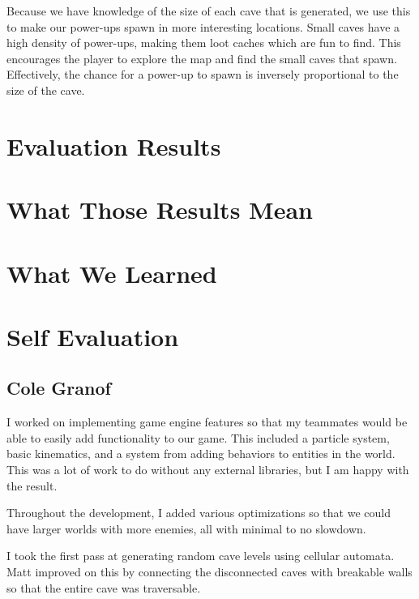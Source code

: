 \documentclass[a4paper, 12pt]{article}
\begin{document}
Because we have knowledge of the size of each cave that is generated, we use
this to make our power-ups spawn in more interesting locations. Small caves have
a high density of power-ups, making them loot caches which are fun to find. This
encourages the player to explore the map and find the small caves that spawn.
Effectively, the chance for a power-up to spawn is inversely proportional to the
size of the cave.



\section{Evaluation Results}



\section{What Those Results Mean}



\section{What We Learned}



\section{Self Evaluation}

\subsection{Cole Granof}

I worked on implementing game engine features so that my teammates would be able
to easily add functionality to our game. This included a particle system, basic
kinematics, and a system from adding behaviors to entities in the world. This
was a lot of work to do without any external libraries, but I am happy with the
result.

Throughout the development, I added various optimizations so that we could have
larger worlds with more enemies, all with minimal to no slowdown.

I took the first pass at generating random cave levels using cellular automata.
Matt improved on this by connecting the disconnected caves with breakable walls
so that the entire cave was traversable.
\end{document}
